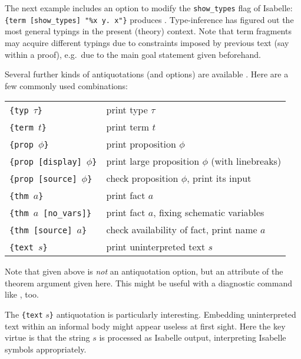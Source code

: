 \begin{isabellebody}
\begin{isamarkuptext}
  \medskip The next example includes an option to modify the
  \verb,show_types, flag of Isabelle:
  \texttt{{\at}}\verb,{term [show_types] "%x y. x"}, produces .  Type-inference has figured out the most
  general typings in the present (theory) context.  Note that term
  fragments may acquire different typings due to constraints imposed
  by previous text (say within a proof), e.g.\ due to the main goal
  statement given beforehand.

  \medskip Several further kinds of antiquotations (and options) are
  available \cite{isabelle-sys}.  Here are a few commonly used
  combinations:

  \medskip

  \begin{tabular}{ll}
  \texttt{\at}\verb,{typ,~$\tau$\verb,}, & print type $\tau$ \\
  \texttt{\at}\verb,{term,~$t$\verb,}, & print term $t$ \\
  \texttt{\at}\verb,{prop,~$\phi$\verb,}, & print proposition $\phi$ \\
  \texttt{\at}\verb,{prop [display],~$\phi$\verb,}, & print large proposition $\phi$ (with linebreaks) \\
  \texttt{\at}\verb,{prop [source],~$\phi$\verb,}, & check proposition $\phi$, print its input \\
  \texttt{\at}\verb,{thm,~$a$\verb,}, & print fact $a$ \\
  \texttt{\at}\verb,{thm,~$a$~\verb,[no_vars]}, & print fact $a$, fixing schematic variables \\
  \texttt{\at}\verb,{thm [source],~$a$\verb,}, & check availability of fact, print name $a$ \\
  \texttt{\at}\verb,{text,~$s$\verb,}, & print uninterpreted text $s$ \\
  \end{tabular}

  \medskip

  Note that  given above is \emph{not} an
  antiquotation option, but an attribute of the theorem argument given
  here.  This might be useful with a diagnostic command like
  , too.

  \medskip The \texttt{\at}\verb,{text, $s$\verb,}, antiquotation is
  particularly interesting.  Embedding uninterpreted text within an
  informal body might appear useless at first sight.  Here the key
  virtue is that the string $s$ is processed as Isabelle output,
  interpreting Isabelle symbols appropriately.


\end{isamarkuptext}
\end{isabellebody}
